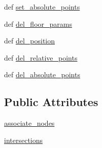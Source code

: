 \begin{DoxyCompactItemize}
\item 
def \hyperlink{classstructure_1_1_floor_1_1_floor_ad94a40179156d337ba13444ec33dd12a}{set\-\_\-absolute\-\_\-points}
\item 
def \hyperlink{classstructure_1_1_floor_1_1_floor_ab1fe2a2c0eb6caa489e108c046d06f33}{del\-\_\-floor\-\_\-params}
\item 
def \hyperlink{classstructure_1_1_floor_1_1_floor_aff388e2cd62184605f9decdb89ef8f4a}{del\-\_\-position}
\item 
def \hyperlink{classstructure_1_1_floor_1_1_floor_a8468b17cb6d327a262ec13ae2c355f0c}{del\-\_\-relative\-\_\-points}
\item 
def \hyperlink{classstructure_1_1_floor_1_1_floor_a3ff7bde10351399770ac121a9940cad6}{del\-\_\-absolute\-\_\-points}
\end{DoxyCompactItemize}
\subsection*{Public Attributes}
\begin{DoxyCompactItemize}
\item 
\hyperlink{classstructure_1_1_floor_1_1_floor_ad2d9805afd11e3a1a44159b6969c628d}{associate\-\_\-nodes}
\item 
\hyperlink{classstructure_1_1_floor_1_1_floor_a2c783ffb1ebb0f953381555fdd1d45c8}{intersections}
\end{DoxyCompactItemize}
